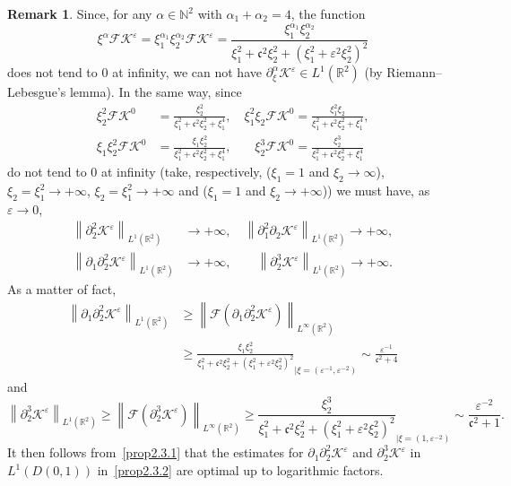 \documentclass[10pt]{amsart}
\theoremstyle{definition}\newtheorem{defi}[theo]{Definition}\newtheorem{rema}[theo]{Remark}\newtheorem{exam}[theo]{Example}\newtheorem{exem}[theo]{Example}\newtheorem{nota}[theo]{Notation}
\newcommand*\p{\partial}
\newcommand*\R{\mathbb R}
\newcommand*\N{\mathbb N}
\newcommand*\BK{\mathcal{K}}
\newcommand*\Fou{\mathscr{F}}
\newcommand*\cs{{\mathfrak c}}
\newcommand*\ii{\infty}
\newcommand*\gs{\geqslant }
\newcommand*\e{\varepsilon}
\begin{document}
\begin{rema}
Since, for any $ \alpha \in \N^2 $ with $ \alpha_1 + \alpha_2 = 4 $, the function
\[
\xi^\alpha \Fou \BK^\e = \xi_1^{\alpha_1} \xi_2^{\alpha_2} \Fou \BK^\e = \frac{\xi_1^{\alpha_1} \xi_2^{\alpha_2}}{ \xi_1^2 + \cs^2 \xi_2^2 + \left(\xi_1^2 + \e^2 \xi_2^2\right)^2 }
\]
does not tend to $ 0 $ at infinity, we can not have $ \p_\xi^\alpha \BK^\e \in L^1 (\R^2) $ (by Riemann--Lebesgue's lemma). In the same way, since
\begin{align*}
\xi_2^2 \Fou \BK^0 &= \frac{\xi_2^2}{ \xi_1^2 + \cs^2 \xi_2^2 + \xi_1^4 },
\quad \xi_1^2 \xi_2 \Fou \BK^0 = \frac{\xi_1^2 \xi_2}{ \xi_1^2 + \cs^2 \xi_2^2 + \xi_1^4 },
\\
\xi_1 \xi_2^2 \Fou \BK^0 &= \frac{\xi_1 \xi_2^2}{ \xi_1^2 + \cs^2 \xi_2^2 + \xi_1^4 }, \quad\;\;\;
\xi_2^3 \Fou \BK^0 = \frac{ \xi_2^3}{\xi_1^2 + \cs^2 \xi_2^2 + \xi_1^4}
\end{align*}
do not tend to $ 0 $ at infinity (take, respectively, ($ \xi_1 = 1 $ and $ \xi_2 \to \ii $), $ \xi_2 = \xi_1^2 \to + \ii $, $ \xi_2 = \xi_1^{2} \to + \ii $ and ($ \xi_1 = 1 $ and $ \xi_2 \to +\ii $)) we must have, as $ \e \to 0 $,
\begin{align*}
\left\| \p_2^2 \BK^\e \right\|_{ L^1 (\R^2) } &\to + \ii,
\quad \left\| \p_1^2 \p_2 \BK^\e \right\|_{ L^1 (\R^2) } \to + \ii,
\\
\left\| \p_1 \p_2^2 \BK^\e \right\|_{ L^1 (\R^2) } &\to + \ii,
\qquad \left\| \p_2^3 \BK^\e \right\|_{ L^1 (\R^2) } \to + \ii.
\end{align*}
As a matter of fact,
\begin{align*}
\left\| \p_1 \p_2^2 \BK^\e \right\|_{ L^1 (\R^2) } & \gs \left\| \Fou \left(\p_1 \p_2^2 \BK^\e\right) \right\|_{ L^\ii (\R^2) }
\\ &
\gs \frac{\xi_1 \xi_2^2}{ \xi_1^2 + \cs^2 \xi_2^2 + \left(\xi_1^2 + \e^2 \xi_2^2\right)^2 }_{|\xi = (\e^{-1}, \e^{-2})}
\sim \frac{ \e^{-1} }{ \cs^2 + 4 }
\end{align*}
and
\[
\left\| \p_2^3 \BK^\e \right\|_{ L^1 (\R^2) }
\gs \left\| \Fou \left(\p_2^3 \BK^\e\right) \right\|_{ L^\ii (\R^2) }
\gs \frac{\xi_2^3}{ \xi_1^2 + \cs^2 \xi_2^2 + \left(\xi_1^2 + \e^2 \xi_2^2\right)^2 }_{|\xi = \left(1, \e^{-2}\right)}
\sim \frac{ \e^{-2} }{ \cs^2 + 1 }.
\]
It then follows from~\eqref{prop2.3.1} that the estimates for $ \p_1 \p_2^2 \BK^\e $ and $ \p_2^3 \BK^\e $ in $ L^1 (D(0,1)) $ in~\eqref{prop2.3.2} are optimal up to logarithmic factors.
\end{rema}
\end{document}
